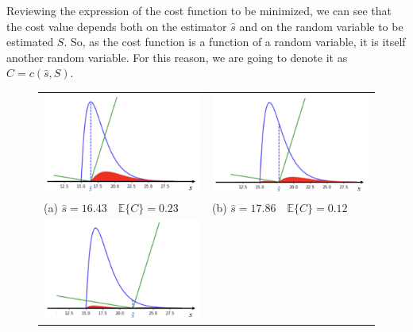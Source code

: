 \begin{solution}
\begin{itemize}
Reviewing the expression of the cost function to be minimized, we can see that the cost value depends both on the estimator $\hat{s}$ and on the random variable to be estimated $S$. So, as the cost function is a function of a random variable, it is itself another random variable. For this reason, we are going to denote it as $ C = c(\hat{s},S)$.

\begin{figure}[!t]

\begin{tabular}{m{}m{}}
\includegraphics[scale=.3]{Figures/Fig_MC1_6.png}&
\includegraphics[scale=.3]{Figures/Fig_MC1_7.png}\\
(a) $\hat{s} = 16.43 \quad \mathbb{E}\{C\} = 0.23$ &
(b) $\hat{s} =  17.86 \quad  \mathbb{E}\{C\} = 0.12 $ \\
\includegraphics[scale=.3]{Figures/Fig_MC1_8.png}&

\end{tabular}
\end{figure}
\end{itemize}
\end{solution}
